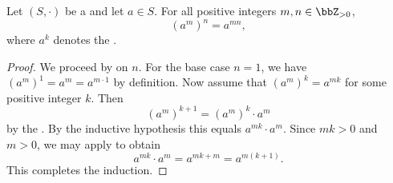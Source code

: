 \begin{lemma} \label{lemma:power_of_power_in_semigroup_for_positive_integers}
    Let $(S, \cdot)$ be a  and let $a \in S$. For all positive integers $m, n \in \bbZ_{>0}$,
    $$ (a^m)^n = a^{mn}, $$
    where $a^k$ denotes the .
\end{lemma}

\begin{proof}
    We proceed by  on $n$. For the base case $n = 1$, we have $(a^m)^1 = a^m = a^{m \cdot 1}$ by definition. Now assume that $(a^m)^k = a^{mk}$ for some positive integer $k$. Then
    $$ (a^m)^{k+1} = (a^m)^k \cdot a^m $$
    by the . By the inductive hypothesis this equals $a^{mk} \cdot a^m$. Since $mk > 0$ and $m > 0$, we may apply  to obtain
    $$ a^{mk} \cdot a^m = a^{mk + m} = a^{m(k+1)}. $$
    This completes the induction.
\end{proof}
